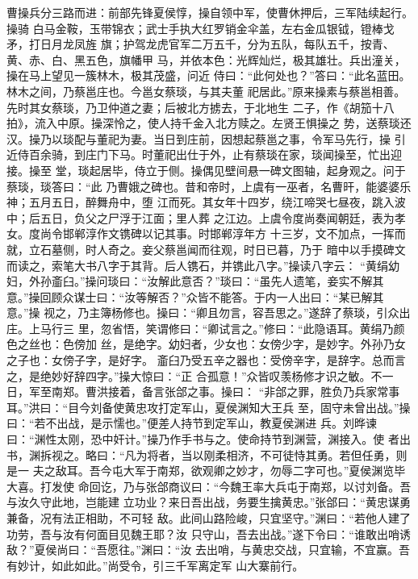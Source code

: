 曹操兵分三路而进：前部先锋夏侯惇，操自领中军，使曹休押后，三军陆续起行。操骑
白马金鞍，玉带锦衣；武士手执大红罗销金伞盖，左右金瓜银钺，镫棒戈矛，打日月龙凤旌
旗；护驾龙虎官军二万五千，分为五队，每队五千，按青、黄、赤、白、黑五色，旗幡甲
马，并依本色：光辉灿烂，极其雄壮。兵出潼关，操在马上望见一簇林木，极其茂盛，问近
侍曰：“此何处也？”答曰：“此名蓝田。林木之间，乃蔡邕庄也。今邕女蔡琰，与其夫董
祀居此。”原来操素与蔡邕相善。先时其女蔡琰，乃卫仲道之妻；后被北方掳去，于北地生
二子，作《胡笳十八拍》，流入中原。操深怜之，使人持千金入北方赎之。左贤王惧操之
势，送蔡琰还汉。操乃以琰配与董祀为妻。当日到庄前，因想起蔡邕之事，令军马先行，操
引近侍百余骑，到庄门下马。时董祀出仕于外，止有蔡琰在家，琰闻操至，忙出迎接。操至
堂，琰起居毕，侍立于侧。操偶见壁间悬一碑文图轴，起身观之。问于蔡琰，琰答曰：“此
乃曹娥之碑也。昔和帝时，上虞有一巫者，名曹旰，能婆婆乐神；五月五日，醉舞舟中，堕
江而死。其女年十四岁，绕江啼哭七昼夜，跳入波中；后五日，负父之尸浮于江面；里人葬
之江边。上虞令度尚奏闻朝廷，表为孝女。度尚令邯郸淳作文镌碑以记其事。时邯郸淳年方
十三岁，文不加点，一挥而就，立石墓侧，时人奇之。妾父蔡邕闻而往观，时日已暮，乃于
暗中以手摸碑文而读之，索笔大书八字于其背。后人镌石，并镌此八字。”操读八字云：
“黄绢幼妇，外孙齑臼。”操问琰曰：“汝解此意否？”琰曰：“虽先人遗笔，妾实不解其
意。”操回顾众谋士曰：“汝等解否？”众皆不能答。于内一人出曰：“某已解其意。”操
视之，乃主簿杨修也。操曰：“卿且勿言，容吾思之。”遂辞了蔡琰，引众出庄。上马行三
里，忽省悟，笑谓修曰：“卿试言之。”修曰：“此隐语耳。黄绢乃颜色之丝也：色傍加
丝，是绝字。幼妇者，少女也：女傍少字，是妙字。外孙乃女之子也：女傍子字，是好字。
齑臼乃受五辛之器也：受傍辛字，是辞字。总而言之，是绝妙好辞四字。”操大惊曰：“正
合孤意！”众皆叹羡杨修才识之敏。不一日，军至南郑。曹洪接着，备言张郃之事。操曰：
“非郃之罪，胜负乃兵家常事耳。”洪曰：“目今刘备使黄忠攻打定军山，夏侯渊知大王兵
至，固守未曾出战。”操曰：“若不出战，是示懦也。”便差人持节到定军山，教夏侯渊进
兵。刘晔谏曰：“渊性太刚，恐中奸计。”操乃作手书与之。使命持节到渊营，渊接入。使
者出书，渊拆视之。略曰：“凡为将者，当以刚柔相济，不可徒恃其勇。若但任勇，则是一
夫之敌耳。吾今屯大军于南郑，欲观卿之妙才，勿辱二字可也。”夏侯渊览毕大喜。打发使
命回讫，乃与张郃商议曰：“今魏王率大兵屯于南郑，以讨刘备。吾与汝久守此地，岂能建
立功业？来日吾出战，务要生擒黄忠。”张郃曰：“黄忠谋勇兼备，况有法正相助，不可轻
敌。此间山路险峻，只宜坚守。”渊曰：“若他人建了功劳，吾与汝有何面目见魏王耶？汝
只守山，吾去出战。”遂下令曰：“谁敢出哨诱敌？”夏侯尚曰：“吾愿往。”渊曰：“汝
去出哨，与黄忠交战，只宜输，不宜赢。吾有妙计，如此如此。”尚受令，引三千军离定军
山大寨前行。

